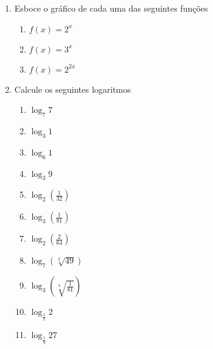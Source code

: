\documentclass[a4paper]{article}
\begin{document}
\begin{enumerate}
\item Esboce o gráfico de cada uma das seguintes funções
  \begin{enumerate}
  \item $f(x) = 2^x$
  \item $f(x) = 3^x$
  \item $f(x) = 2^{2x}$
  \end{enumerate}

\item Calcule os seguintes logaritmos
  \begin{enumerate}
  \item $\log_7 7$
  \item $\log_3 1$
  \item $\log_6 1$
  \item $\log_3 9$
  \item $\log_2 \left(\frac{1}{32}\right)$
  \item $\log_3 \left(\frac{1}{81}\right)$
  \item $\log_2 \left(\frac{2}{64}\right)$
  \item $\log_7 \left(\sqrt[3]{49}\right)$
  \item $\log_3 \left(\sqrt[4]{\frac{1}{81}}\right)$
  \item $\log_\frac{1}{2} 2$
  \item $\log_\frac{1}{9} 27$
  \end{enumerate}

\end{enumerate}
\end{document}
